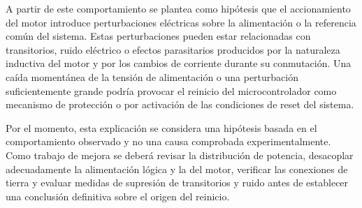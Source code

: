 A partir de este comportamiento se plantea como hipótesis que el accionamiento del motor introduce perturbaciones eléctricas sobre la alimentación o la referencia común del sistema. Estas perturbaciones pueden estar relacionadas con transitorios, ruido eléctrico o efectos parasitarios producidos por la naturaleza inductiva del motor y por los cambios de corriente durante su conmutación. Una caída momentánea de la tensión de alimentación o una perturbación suficientemente grande podría provocar el reinicio del microcontrolador como mecanismo de protección o por activación de las condiciones de reset del sistema.

Por el momento, esta explicación se considera una hipótesis basada en el comportamiento observado y no una causa comprobada experimentalmente. Como trabajo de mejora se deberá revisar la distribución de potencia, desacoplar adecuadamente la alimentación lógica y la del motor, verificar las conexiones de tierra y evaluar medidas de supresión de transitorios y ruido antes de establecer una conclusión definitiva sobre el origen del reinicio.
